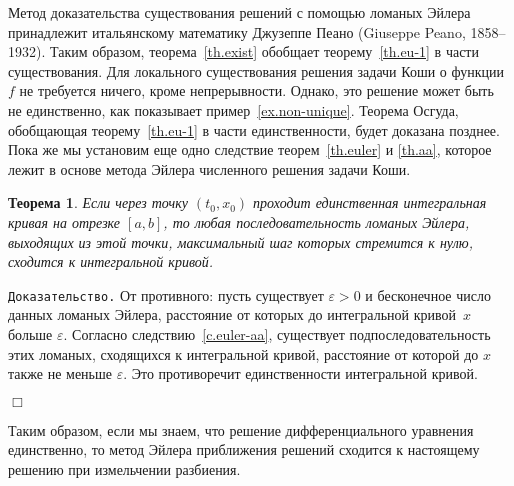 \documentclass[12pt,a4paper]{article}
\newtheorem{theorem}{Теорема}
\begin{document}
Метод доказательства существования решений с помощью ломаных Эйлера принадлежит итальянскому математику
Джузеппе Пеано (Giuseppe Peano, 1858--1932).
Таким образом, теорема~\ref{th.exist} обобщает теорему~\ref{th.eu-1} в части существования. Для локального существования
решения задачи Коши о функции $f$ не требуется ничего, кроме непрерывности. Однако, это решение может быть  не единственно, как показывает пример~\ref{ex.non-unique}. Теорема Осгуда, обобщающая теорему~\ref{th.eu-1} в части единственности, будет доказана позднее. Пока же мы установим еще одно следствие теорем~\ref{th.euler} и \ref{th.aa}, которое  лежит в основе метода Эйлера численного решения задачи Коши.
\begin{theorem}\label{th.euler-numer}
Если через точку $(t_0, x_0)$ проходит единственная интегральная кривая на отрезке $[a, b]$, то
любая последовательность ломаных Эйлера, выходящих из этой точки, максимальный шаг которых стремится к нулю,
сходится к интегральной кривой.
\end{theorem}
{\tt Доказательство.} От противного: пусть  существует $\varepsilon > 0$ и бесконечное число данных
ломаных Эйлера, расстояние от которых до интегральной кривой~$x$ больше $\varepsilon$.
 Согласно следствию~\ref{c.euler-aa}, существует подпоследовательность этих ломаных, сходящихся к интегральной кривой,
 расстояние от которой до $x$ также не меньше $\varepsilon$. Это противоречит единственности интегральной кривой.

   {\hfill $\Box$}
\medskip


Таким образом, если мы знаем, что решение дифференциального уравнения единственно, то метод Эйлера приближения
решений сходится к настоящему решению при измельчении разбиения.
\end{document}
